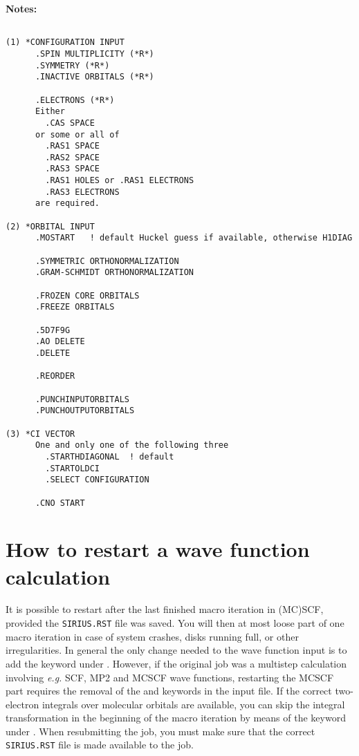 {\bf Notes:}

\begin{verbatim}

(1) *CONFIGURATION INPUT
      .SPIN MULTIPLICITY (*R*)
      .SYMMETRY (*R*)
      .INACTIVE ORBITALS (*R*)

      .ELECTRONS (*R*)
      Either
        .CAS SPACE
      or some or all of
        .RAS1 SPACE
        .RAS2 SPACE
        .RAS3 SPACE
        .RAS1 HOLES or .RAS1 ELECTRONS
        .RAS3 ELECTRONS
      are required.

(2) *ORBITAL INPUT
      .MOSTART   ! default Huckel guess if available, otherwise H1DIAG

      .SYMMETRIC ORTHONORMALIZATION
      .GRAM-SCHMIDT ORTHONORMALIZATION

      .FROZEN CORE ORBITALS
      .FREEZE ORBITALS

      .5D7F9G
      .AO DELETE
      .DELETE

      .REORDER

      .PUNCHINPUTORBITALS
      .PUNCHOUTPUTORBITALS

(3) *CI VECTOR
      One and only one of the following three
        .STARTHDIAGONAL  ! default
        .STARTOLDCI
        .SELECT CONFIGURATION

      .CNO START
\end{verbatim}

\pagebreak[3]
\section{\label{sec:ig_restart} How to restart a wave function calculation}

It is possible to restart after the last finished
macro iteration in (MC)SCF, provided the \verb|SIRIUS.RST|
file was saved.  You will then at most
loose part of one macro iteration in case of system crashes, disks
running full, or other irregularities. \noindent In general the
only change needed to the wave function input is to add the
 keyword under . However, if the
original job was a multistep calculation involving {\it e.g.\/} SCF,
MP2 and MCSCF wave functions, restarting the MCSCF part requires the
removal of the  and  keywords in the input
file. If the correct
two-electron integrals over molecular orbitals are available, you
can skip the integral transformation 
in the beginning of the macro iteration by means
of the  keyword under
. When resubmitting the job, you must make
sure that the correct \verb|SIRIUS.RST| file is
made available to the job.

